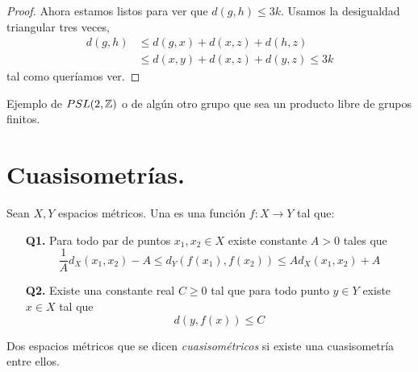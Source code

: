 \documentclass[tesis.tex]{subfiles}
\begin{document}
\begin{proof}
Ahora estamos listos para ver que $d(g,h) \le 3k$. Usamos la desigualdad triangular tres veces,
\begin{align*}
	d(g,h) & \le d(g,x) + d(x,z) + d(h,z) \\
	& \le d(x,y) + d(x,z) + d(y,z) \le 3k
\end{align*}
tal como queríamos ver.
\end{proof}

\begin{ej}
	Ejemplo de $PSL(2,\mathbb{Z})$ o de algún otro grupo que sea un producto libre de grupos finitos.
\end{ej}


\section{Cuasisometrías.}


\begin{deff}
	Sean $X,Y$ espacios métricos. Una  es una función $f:X \to Y$ tal que:
	\begin{itemize}
	\item[\textbf{Q1.}] Para todo par de puntos $x_1,x_2 \in X$ existe constante $A > 0$ tales que
	\[
	\frac{1}{A} d_X(x_1,x_2) - A \le d_Y(f(x_1),f(x_2)) \le A d_X(x_1,x_2) + A
	\]
	\item[\textbf{Q2.}] Existe una constante real $C \ge 0$ tal que para todo punto $y \in Y$ existe $x \in X$ tal que 
	\[
	d(y,f(x)) \le C
	\]
	\end{itemize}
 	Dos espacios métricos que se dicen \emph{cuasisométricos} si existe una cuasisometría entre ellos.
\end{deff}
\end{document}
